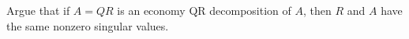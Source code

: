 \documentclass[12pt, leqno]{article}
\begin{document}

Argue that if $A = QR$ is an economy QR decomposition of $A$, then $R$
and $A$ have the same nonzero singular values.
\end{document}

